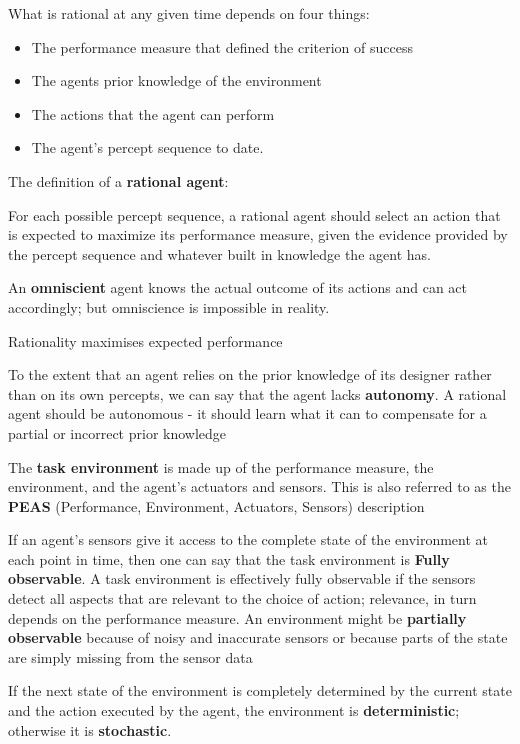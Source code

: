 \documentclass{article}
\begin{document}
What is rational at any given time depends on four things:
\begin{itemize}
\item The performance measure that defined the criterion of success
\item The agents prior knowledge of the environment
\item The actions that the agent can perform
\item The agent's percept sequence to date.

\end{itemize}

The definition of a \textbf{rational agent}:

For each possible percept sequence, a rational agent should select an action that is expected to maximize its performance measure, given the evidence provided by the percept sequence and whatever built in knowledge the agent has. \newline

An \textbf{omniscient} agent knows the actual outcome of its actions and can act accordingly; but omniscience is impossible in reality.

Rationality maximises expected performance

To the extent that an agent relies on the prior knowledge of its designer rather than on its own percepts, we can say that the agent lacks \textbf{autonomy}. A rational agent should be autonomous - it should learn what it can to compensate for a partial or incorrect prior knowledge

The \textbf{task environment} is made up of  the performance measure, the environment, and the agent's actuators and sensors. This is also referred to as the \textbf{PEAS} (Performance, Environment, Actuators, Sensors) description \newline

If an agent's sensors give it access to the complete state of the environment at each point in time, then one can say that the task environment is \textbf{Fully observable}. A task environment is effectively fully observable if the sensors detect all aspects that are relevant to the choice of action; relevance, in turn depends on the performance measure. An environment might be \textbf{partially observable} because of noisy and inaccurate sensors or because parts of the state are simply missing from the sensor data \newline

If the next state of the environment is completely determined by the current state and the action executed by the agent, the environment is \textbf{deterministic}; otherwise it is \textbf{stochastic}. \newline
\end{document}
